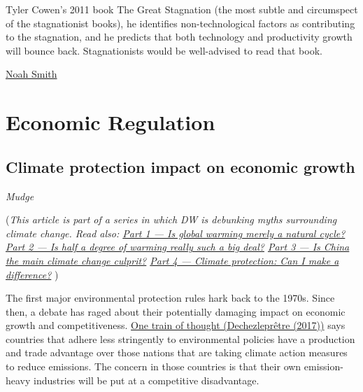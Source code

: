 \documentclass[
]{book}
\begin{document}
Tyler Cowen's 2011 book The Great Stagnation (the most subtle and circumspect of the stagnationist books), he identifies non-technological factors as contributing to the stagnation, and he predicts that both technology and productivity growth will bounce back. Stagnationists would be well-advised to read that book.

\href{https://noahpinion.substack.com/p/answering-the-techno-pessimists-complete}{Noah Smith}

\hypertarget{economic-regulation}{%
\chapter{Economic Regulation}\label{economic-regulation}}

\hypertarget{climate-protection-impact-on-economic-growth}{%
\section{Climate protection impact on economic growth}\label{climate-protection-impact-on-economic-growth}}

\emph{Mudge}

(\emph{This article is part of a series in which DW is debunking myths surrounding climate change.
Read also:
\href{https://www.dw.com/en/fact-check-is-global-warming-merely-a-natural-cycle/a-57831350}{Part 1 --- Is global warming merely a natural cycle?}
\href{https://www.dw.com/en/fact-check-is-half-a-degree-of-warming-really-such-a-big-deal-for-the-planet/a-57859167}{Part 2 --- Is half a degree of warming really such a big deal?}
\href{https://www.dw.com/en/fact-check-is-china-the-main-climate-change-culprit/a-57777113}{Part 3 --- Is China the main climate change culprit?}
\href{https://www.dw.com/en/fact-check-what-can-i-do-for-climate-protection/a-57980888}{Part 4 --- Climate protection: Can I make a difference?} })

The first major environmental protection rules hark back to the 1970s. Since then, a debate has raged about their potentially damaging impact on economic growth and competitiveness.
\href{https://www.journals.uchicago.edu/doi/pdf/10.1093/reep/rex013}{One train of thought (Dechezleprêtre (2017))} says countries that adhere less stringently to environmental policies have a production and trade advantage over those nations that are taking climate action measures to reduce emissions. The concern in those countries is that their own emission-heavy industries will be put at a competitive disadvantage.
\end{document}
